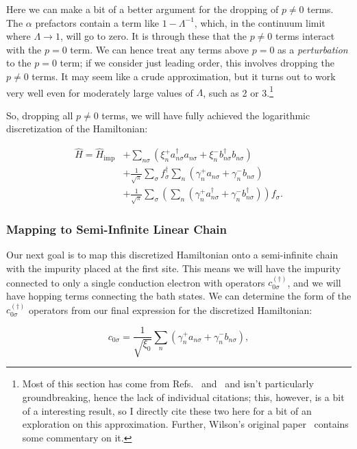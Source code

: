 Here we can make a bit of a better argument for the dropping of $p\neq0$ terms. The $\alpha$ prefactors contain a term like $1-\Lambda^{-1}$, which, in the continuum limit where $\Lambda \rightarrow 1$, will go to zero. It is through these that the $p\neq0$ terms interact with the $p=0$ term. We can hence treat any terms above $p=0$ as a \textit{perturbation} to the $p=0$ term; if we consider just leading order, this involves dropping the $p\neq0$ terms. It may seem like a crude approximation, but it turns out to work very well even for moderately large values of $\Lambda$, such as 2 or 3.\footnote{Most of this section has come from Refs.~\cite{Bulla_2008} and~\cite{Hewson_1993} and isn't particularly groundbreaking, hence the lack of individual citations; this, however, is a bit of a interesting result, so I directly cite these two here for a bit of an exploration on this approximation. Further, Wilson's original paper~\cite{Wilson_1975} contains some commentary on it.}

So, dropping all $p \neq 0$ terms, we will have fully achieved the logarithmic discretization of the Hamiltonian:

\begin{align}
  \hat{H} = \hat{H}_{\mathrm{imp}} &+ \sum_{n\sigma} \left( \xi^+_n a^\dagger_{n\sigma}a_{n\sigma} + \xi^-_n b^\dagger_{n\sigma}b_{n\sigma} \right) \\
          &+ \frac{1}{\sqrt{\pi}}\sum_\sigma f^\dagger_\sigma \sum_n \left( \gamma^+_n a_{n\sigma} + \gamma^-_n b_{n\sigma} \right) \\
          &+ \frac{1}{\sqrt{\pi}} \sum_\sigma \left( \sum_n \left( \gamma^+_n a^\dagger_{n\sigma} + \gamma^-_n b^\dagger_{n\sigma} \right) \right)f_\sigma.
\end{align}


\subsubsection{Mapping to Semi-Infinite Linear Chain}

Our next goal is to map this discretized Hamiltonian onto a semi-infinite chain with the impurity placed at the first site. This means we will have the impurity connected to only a single conduction electron with operators $c^{(\dagger)}_{0\sigma}$, and we will have hopping terms connecting the bath states. We can determine the form of the $c^{(\dagger)}_{0\sigma}$ operators from our final expression for the discretized Hamiltonian:

\begin{equation}
  c_{0\sigma} = \frac{1}{\sqrt{\xi_0}} \sum_n \left( \gamma^+_n a_{n\sigma} + \gamma^-_n b_{n\sigma} \right),
\end{equation}

